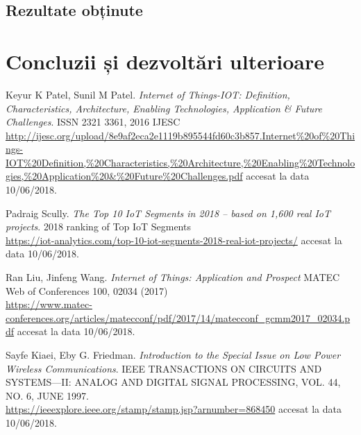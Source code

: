 \documentclass[12pt,a4paper]{report}
\begin{document}
\section{Rezultate obținute}

\chapter{Concluzii și dezvoltări ulterioare}


\begin{thebibliography}{9}
Keyur K Patel, Sunil M Patel. 
\textit{Internet of Things-IOT: Definition, Characteristics, Architecture, Enabling Technologies, Application \& Future Challenges}.
ISSN 2321 3361, 2016 IJESC\\
\href{http://ijesc.org/upload/8e9af2eca2e1119b895544fd60c3b857.Internet\%20of\%20Things-IOT\%20Definition,\%20Characteristics,\%20Architecture,\%20Enabling\%20Technologies,\%20Application\%20\&\%20Future\%20Challenges.pdf}{http://ijesc.org/upload/8e9af2eca2e1119b895544fd60c3b857.Internet\%20of\%20Things-IOT\%20Definition,\%20Characteristics,\%20Architecture,\%20Enabling\%20Technologies,\%20Application\%20\&\%20Future\%20Challenges.pdf} accesat la data 10/06/2018.

Padraig Scully.
\textit{The Top 10 IoT Segments in 2018 – based on 1,600 real IoT projects}. 
2018 ranking of Top IoT Segments\\
\href{https://iot-analytics.com/top-10-iot-segments-2018-real-iot-projects/}{https://iot-analytics.com/top-10-iot-segments-2018-real-iot-projects/} accesat la data 10/06/2018.

Ran Liu, Jinfeng Wang.
\textit{Internet of Things: Application and Prospect }
MATEC Web of Conferences 100, 02034 (2017)\\
\href{https://www.matec-conferences.org/articles/matecconf/pdf/2017/14/matecconf\_gcmm2017\_02034.pdf}{https://www.matec-conferences.org/articles/matecconf/pdf/2017/14/matecconf\_gcmm2017\_02034.pdf} accesat la data 10/06/2018.


Sayfe Kiaei, Eby G. Friedman.
\textit{Introduction to the Special Issue on Low Power Wireless Communications}.
IEEE TRANSACTIONS ON CIRCUITS AND SYSTEMS—II: ANALOG AND DIGITAL SIGNAL PROCESSING, VOL. 44, NO. 6, JUNE 1997.\\
\href{https://ieeexplore.ieee.org/stamp/stamp.jsp?arnumber=868450}{https://ieeexplore.ieee.org/stamp/stamp.jsp?arnumber=868450} accesat la data 10/06/2018.


\end{thebibliography}
\end{document}
